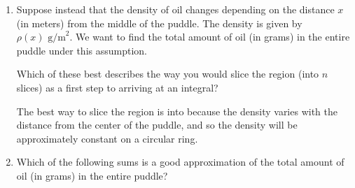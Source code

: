 \documentclass{article}
\begin{document}
\begin{enumerate}
\begin{enumerate}
\begin{solution}
    The total amount of oil will be the area of the puddle multiplied by the area density of the oil. The area of the puddle is $\pi (20\,\text{m})^2 = 400\pi\,\text{m}^2$. So the total amount of oil in the puddle is $(400\pi\,\text{m}^2)(5\,\text{g/m}^2)=\boxed{2000\pi\,\text{g}}$.
\end{solution}
 

\item 

\begin{problem}
Suppose instead that the density of oil changes depending on the distance $x$ (in meters) from the middle of the puddle. The density is given by $\rho(x) \text{ g/m}^2$. We want to find the total amount of oil (in grams) in the entire puddle under this assumption.

 Which of these best describes the way you would slice the region (into $n$ slices) as a first step to arriving at an integral? 
 \end{problem}

 \begin{solution}
     The best way to slice the region is into  because the density varies with the distance from the center of the puddle, and so the density will be approximately constant on a circular ring.
 \end{solution}
 \item 
 \begin{problem}
 Which of the following sums is a good approximation of the total amount of oil (in grams) in the entire puddle? 
 \end{problem}


\end{enumerate}
\end{enumerate}
\end{document}
